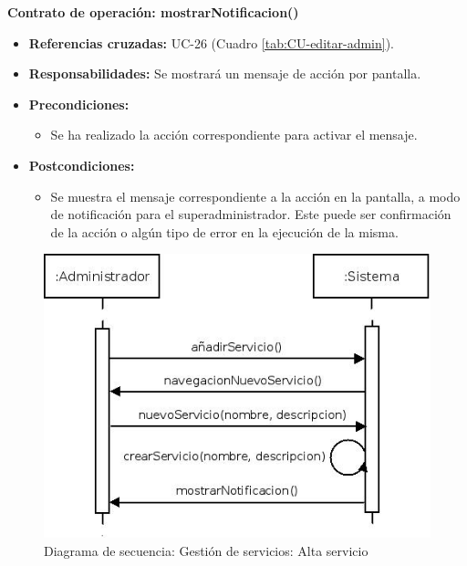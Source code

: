 \textbf{Contrato de operación: mostrarNotificacion()}
\begin{itemize}
\item \textbf{Referencias cruzadas:} UC-26 (Cuadro \ref{tab:CU-editar-admin}).
\item \textbf{Responsabilidades:} Se mostrará un mensaje de acción por pantalla.
\item \textbf{Precondiciones:} 
 \begin{itemize}
\item Se ha realizado la acción correspondiente para activar el mensaje.
\end {itemize}
\item \textbf{Postcondiciones:} 
 \begin{itemize}
\item Se muestra el mensaje correspondiente a la acción en la pantalla, a modo de notificación para el superadministrador. Este puede ser confirmación de la acción o algún tipo de error en la ejecución de la misma.
\end {itemize}
\end {itemize}


\vspace{10mm}

\begin{figure}[H]
\centering
  \includegraphics[scale=.55]{img/secuencias/gestion-servicios-alta-servicio.jpeg}
  \caption{Diagrama de secuencia: Gestión de servicios: Alta servicio}
  \label{fig:secuencia-gestion-servicios-alta-servicio}
\end{figure}

